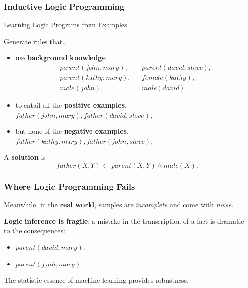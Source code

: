\documentclass[bigger]{beamer}
\begin{document}
%
\begin{frame}
    \frametitle{Inductive Logic Programming}
    \small

    \vfill
    \begin{center}
        Learning Logic Programs from Examples.
    \end{center}

    \vfill
    \alert{Generate rules} that\ldots
    \begin{itemize}
        \item use \textbf{background knowledge}
        $$
            \begin{aligned}
                 & parent(john,mary),  &  & parent(david,steve), \\
                 & parent(kathy,mary), &  & female(kathy),       \\
                 & male(john),         &  & male(david).
            \end{aligned}
        $$
        \item to entail all the \textbf{positive examples}, $father(john,mary), father(david,steve)$,
        \item but none of the \textbf{negative examples}. $father(kathy,mary), father(john,steve)$,
        
    \end{itemize}

    \vfill
    A \textbf{solution} is $$father(X,Y) \leftarrow parent(X,Y) \wedge male(X).$$

\end{frame}
%
\begin{frame}
    \frametitle{Where Logic Programming Fails}
    \begin{center}
        Meanwhile, in the \textbf{real world}, samples are \emph{incomplete} and come with \emph{noise}.
    \end{center}
    \vfill
    \textbf{Logic inference is \alert{fragile}}: a mistake in the transcription of a fact is dramatic to the consequences:
    \begin{itemize}
        \item $parent(david,mary)$.
        \item $parent(jonh,mary)$.
    \end{itemize}
    \vfill
    \begin{center}
        The statistic essence of machine learning provides \alert{robustness}.
    \end{center}
\end{frame}
%
%
\end{document}
